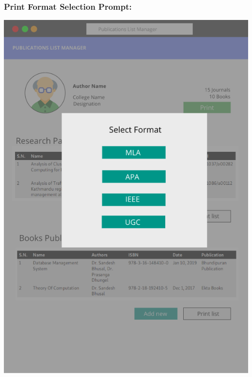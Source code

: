 \documentclass[12pt]{extarticle}
\begin{document}
		\subsubsection{Print Format Selection Prompt:}
			\includegraphics[scale=.7]{print_format_select}
\end{document}
